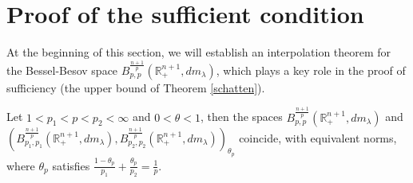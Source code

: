 \documentclass[12pt]{amsart}
\begin{document}
\section{Proof of the sufficient condition}
At the beginning of this section, we will establish an interpolation theorem for the Bessel-Besov space $B_{p,p}^{\frac{n+1}{p}}(\mathbb{R}_+^{n+1},dm_\lambda)$, which plays a key role in the proof of sufficiency (the upper bound of Theorem \ref{schatten}).
\begin{lemma}\label{complexinterpolation}
Let $1<p_1<p<p_2<\infty$ and $0<\theta<1$, then the spaces $B_{p,p}^{\frac{n+1}{p}}(\mathbb{R}_+^{n+1},dm_\lambda)$ and $(B_{p_1,p_1}^{\frac{n+1}{p}}(\mathbb{R}_+^{n+1},dm_\lambda),B_{p_2,p_2}^{\frac{n+1}{p}}(\mathbb{R}_+^{n+1},dm_\lambda))_{\theta_p}$  coincide, with equivalent norms, where $\theta_p$ satisfies $\frac{1-\theta_p}{p_1}+\frac{\theta_p}{p_2}=\frac{1}{p}$.
\end{lemma}
\end{document}
